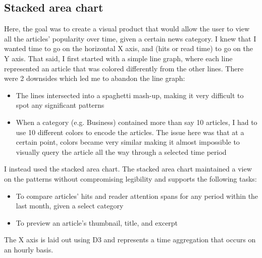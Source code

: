 \documentclass[12pt]{article}
\begin{document}
\subsection{Stacked area chart}

Here, the goal was to create a visual product that would allow the user to view all the articles' popularity over time, given a certain news category. I knew that I wanted time to go on the horizontal X axis, and (hits or read time) to go on the Y axis. That said, I first started with a simple line graph, where each line represented an article that was colored differently from the other lines. There were 2 downsides which led me to abandon the line graph: 
\begin{itemize}
\item The lines intersected into a spaghetti mash-up, making it very difficult to spot any significant patterns
\item When a category (e.g. Business) contained more than say 10 articles, I had to use 10 different colors to encode the articles. The issue here was that at a certain point, colors became very similar making it almost impossible to visually query the article all the way through a selected time period 
\end{itemize}

\noindent I instead used the stacked area chart. The stacked area chart maintained a view on the patterns without compromising legibility and supports the following tasks: 
\begin{itemize}
\item To compare articles' hits and reader attention spans for any period within the last month, given a select category
\item To preview an article's thumbnail, title, and excerpt
\end{itemize}

\noindent The X axis is laid out using D3 and represents a time aggregation that occurs on an hourly basis. 
\end{document}
